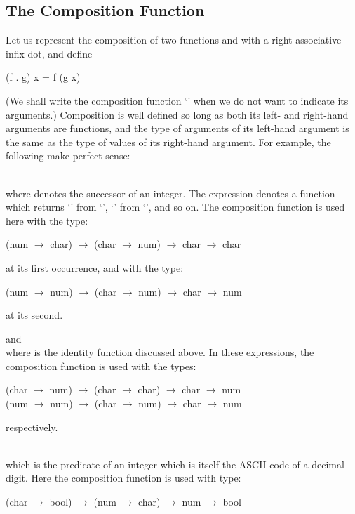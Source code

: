 \subsection{The Composition Function}

Let us represent the composition of two functions  and  with a right-associative infix dot, and define
\begin{mlcoded}
    (f . g) x = f (g x)
\end{mlcoded}
(We shall write the composition function `' when we do not want to
indicate its arguments.) Composition is well defined so long as both its left-
and right-hand arguments are functions, and the type of arguments of its
left-hand argument is the same as the type of values of its right-hand
argument. For example, the following make perfect sense:
\begin{numbered}
    \item {}\\
where  denotes the successor of an integer. The expression denotes a
function which returns `' from `', `' from `', and so on. The composition function is used here with the type:
\begin{mlcoded}
    (num $\rightarrow$ char) $\rightarrow$ (char $\rightarrow$ num) $\rightarrow$ char $\rightarrow$ char
\end{mlcoded}
at its first occurrence, and with the type:
\begin{mlcoded}
    (num $\rightarrow$ num) $\rightarrow$ (char $\rightarrow$ num) $\rightarrow$ char $\rightarrow$ num
\end{mlcoded}
at its second.
    \item {} and \\
    where  is the identity function discussed above. In these expressions, the
    composition function is used with the types:
    \begin{mlcoded}
        (char $\rightarrow$ num) $\rightarrow$ (char $\rightarrow$ char) $\rightarrow$ char $\rightarrow$ num \\
        (num $\rightarrow$ num) $\rightarrow$ (char $\rightarrow$ num) $\rightarrow$ char $\rightarrow$ num
    \end{mlcoded}
    respectively.
    \item {} \\
    which is the predicate of an integer which is itself the ASCII code of a
    decimal digit. Here the composition function is used with type:
    \begin{mlcoded}
        (char $\rightarrow$ bool) $\rightarrow$ (num $\rightarrow$ char) $\rightarrow$ num $\rightarrow$ bool
    \end{mlcoded}
\end{numbered}

